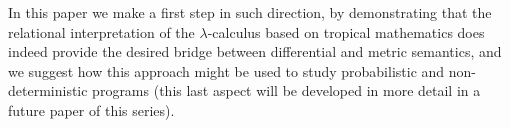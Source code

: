 In this paper we make a first step in such direction, by demonstrating that the relational interpretation of the $\lambda$-calculus based on tropical mathematics does indeed provide the desired bridge between differential and metric semantics, and we suggest how this approach might be used to study probabilistic and non-deterministic programs (this last aspect will be developed in more detail in a future paper of this series). 



%
%
%
